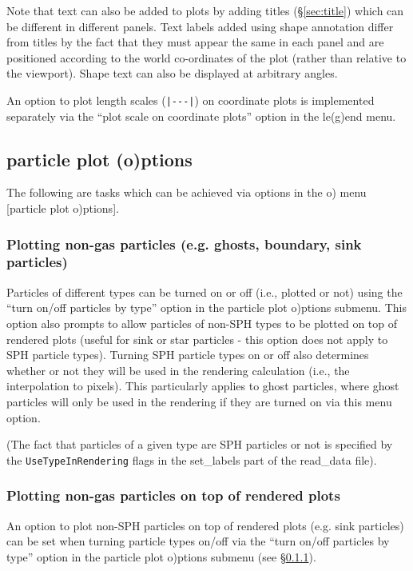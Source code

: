 \documentclass[a4paper,10pt]{article}
\begin{document}
 Note that text can also be added to plots by adding titles (\S\ref{sec:title}) which can be different in different panels. Text labels added using shape annotation differ from titles by the fact that they must appear the same in each panel and are positioned according to the world co-ordinates of the plot (rather than relative to the viewport). Shape text can also be displayed at arbitrary angles.
 
 An option to plot length scales (\verb+|---|+) on coordinate plots is implemented separately via the ``plot scale on coordinate plots'' option in the le(g)end menu.
 
\subsection{particle plot (o)ptions}%
\label{sec:opts}
 The following are tasks which can be achieved via options in the o) menu [particle plot o)ptions].
 
\subsubsection{ Plotting non-gas particles (e.g. ghosts, boundary, sink particles)}
\label{sec:plotparticlesbytype}
 Particles of different types can be turned on or off (i.e., plotted or not) using the ``turn on/off particles by type'' option in the particle plot o)ptions submenu. This option also prompts to allow particles of non-SPH types to be
plotted on top of rendered plots (useful for sink or star particles - this option does not apply to SPH particle types).  Turning SPH particle types on or off also determines whether or not they will be used in the rendering calculation (i.e., the interpolation to pixels). This particularly applies to ghost particles, where ghost particles will only be used in the rendering if they are turned on via this menu option.

 (The fact that particles of a given type are SPH particles or not is specified by the \verb+UseTypeInRendering+
flags in the set\_labels part of the read\_data file).

\subsubsection{ Plotting non-gas particles on top of rendered plots}
 An option to plot non-SPH particles on top of rendered plots (e.g. sink particles) can be set when turning particle types on/off via the ``turn on/off particles by type'' option in the particle plot o)ptions submenu (see \S\ref{sec:plotparticlesbytype}).
\end{document}
